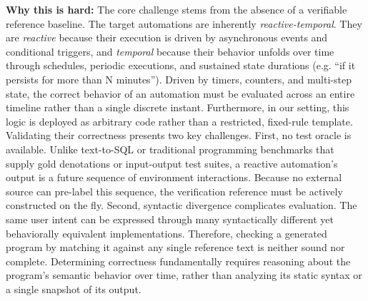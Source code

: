 \documentclass[sigconf,nonacm,anonymous,review]{acmart}
\begin{document}
\textbf{Why this is hard: %
} The core challenge stems from the absence of a verifiable reference baseline. The target automations are inherently \emph{reactive-temporal}. They are \emph{reactive} because their execution is driven by asynchronous events and conditional triggers, %
and \emph{temporal} because their behavior unfolds over time through schedules, periodic executions, and sustained state durations (e.g. ``if it persists for more than N minutes'').
Driven by timers, counters, and multi-step state, the correct behavior of an automation must be evaluated across an entire timeline rather than a single discrete instant. Furthermore, in our setting, this logic is deployed as arbitrary code rather than a restricted, fixed-rule template.
Validating their correctness presents two key challenges. First, no test oracle is available. 
Unlike text-to-SQL or traditional programming benchmarks that supply gold denotations or input-output test suites, a reactive automation's output is a future sequence of environment interactions. Because no external source can pre-label this sequence, the verification reference must be actively constructed on the fly. 
Second, syntactic divergence complicates evaluation. The same user intent can be expressed through many syntactically different yet behaviorally equivalent implementations. Therefore, checking a generated program by matching it against any single reference text is neither sound nor complete. Determining correctness fundamentally requires reasoning about the program’s semantic behavior over time, rather than analyzing its static syntax or a single snapshot of its output. %
\end{document}
